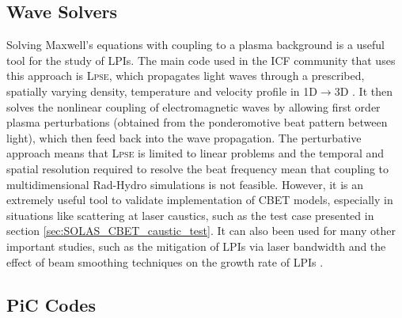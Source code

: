 \subsection{Wave Solvers}

Solving Maxwell's equations with coupling to a plasma background is a useful tool for the study of \ac{LPIs}.
The main code used in the \ac{ICF} community that uses this approach is \textsc{Lpse}, which propagates light waves through a prescribed, spatially varying density, temperature and velocity profile in 1D$\rightarrow$3D \cite{myatt_wave-based_2017,myatt_lpse_2019}.
It then solves the nonlinear coupling of electromagnetic waves by allowing first order plasma perturbations (obtained from the ponderomotive beat pattern between light), which then feed back into the wave propagation.
The perturbative approach means that \textsc{Lpse} is limited to linear problems and the temporal and spatial resolution required to resolve the beat frequency mean that coupling to multidimensional \ac{Rad-Hydro} simulations is not feasible.
However, it is an extremely useful tool to validate implementation of \ac{CBET} models, especially in situations like scattering at laser caustics, such as the test case presented in section \ref{sec:SOLAS_CBET_caustic_test}.
It can also been used for many other important studies, such as the mitigation of \ac{LPIs} via laser bandwidth and the effect of beam smoothing techniques on the growth rate of \ac{LPIs} \cite{follett_thresholds_2021}.

\subsection{\ac{PiC} Codes}

